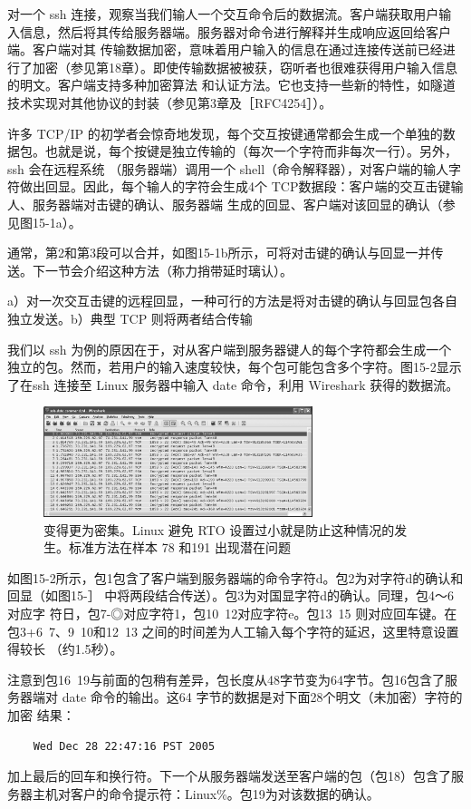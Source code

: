 对一个 ssh 连接，观察当我们输人一个交互命令后的数据流。客户端获取用户输入信息，然后将其传给服务器端。服务器对命令进行解释并生成响应返回给客户端。客户端对其
传输数据加密，意味着用户输入的信息在通过连接传送前已经进行了加密（参见第18章）。即使传输数据被被获，窃听者也很难获得用户输入信息的明文。客户端支持多种加密算法
和认证方法。它也支持一些新的特性，如隧道技术实现对其他协议的封装（参见第3章及［RFC4254］）。

许多 TCP/IP 的初学者会惊奇地发现，每个交互按键通常都会生成一个单独的数据包。也就是说，每个按键是独立传输的（每次一个字符而非每次一行）。另外，ssh 会在远程系统
（服务器端）调用一个 shell（命令解释器），对客户端的输人字符做出回显。因此，每个输人的字符会生成4个 TCP数据段：客户端的交互击键输人、服务器端对击键的确认、服务器端
生成的回显、客户端对该回显的确认（参见图15-1a）。

通常，第2和第3段可以合并，如图15-1b所示，可将对击键的确认与回显一并传送。下一节会介绍这种方法（称力捎带延时璃认）。

a）对一次交互击键的远程回显，一种可行的方法是将对击键的确认与回显包各自独立发送。b）典型 TCP 则将两者结合传输

我们以 ssh 为例的原因在于，对从客户端到服务器键人的每个字符都会生成一个独立的包。然而，若用户的输入速度较快，每个包可能包含多个字符。图15-2显示了在ssh 连接至
Linux 服务器中输入 date 命令，利用 Wireshark 获得的数据流。

\begin{figure}[!htb]
    \centering
	\includegraphics[width=0.7\textwidth]{imgs/15/15-2.png}
	\caption{变得更为密集。Linux 避免 RTO 设置过小就是防止这种情况的发生。标准方法在样本 78 和191 出现潜在问题}
\end{figure}

如图15-2所示，包1包含了客户端到服务器端的命令字符d。包2为对字符d的确认和回显（如图15-］ 中将两段结合传送）。包3为对国显字符d的确认。同理，包4～6对应字
符日，包7-◎对应字符1，包10~12对应字符e。包13~15 则对应回车键。在包3+6~7、9~10和12~13 之间的时间差为人工输入每个字符的延迟，这里特意设置得较长
（约1.5秒）。

注意到包16~19与前面的包稍有差异，包长度从48字节变为64字节。包16包含了服务器端对 date 命令的输出。这64 字节的数据是对下面28个明文（未加密）字符的加密
结果：
\begin{verbatim}
    Wed Dec 28 22:47:16 PST 2005
\end{verbatim}
加上最后的回车和换行符。下一个从服务器端发送至客户端的包（包18）包含了服务器主机对客户的命令提示符：Linux\%。包19为对该数据的确认。

